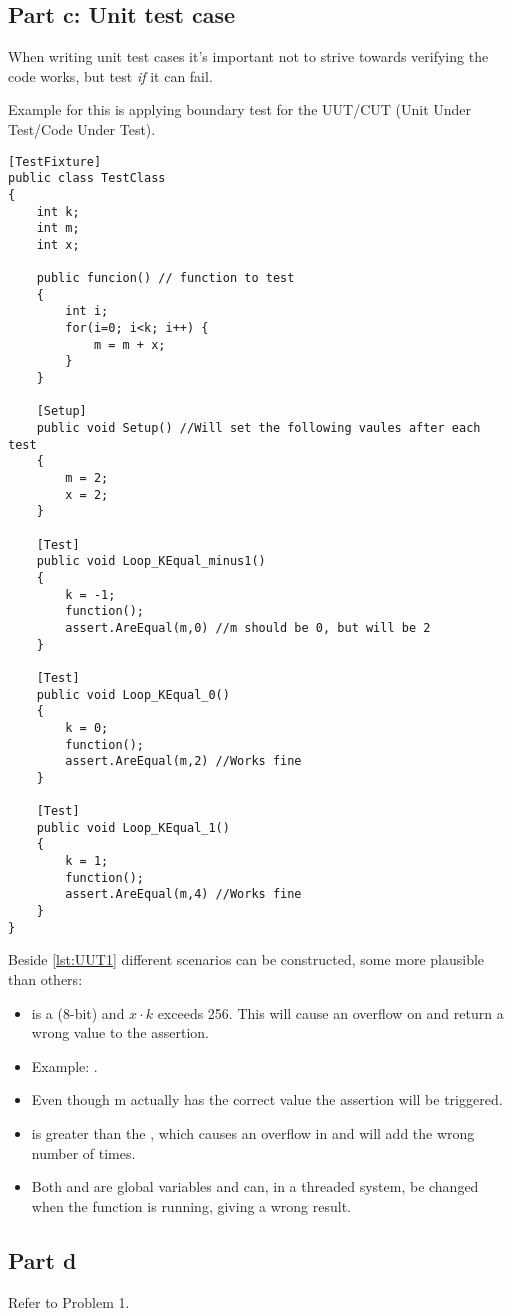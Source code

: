\documentclass[Main_Assignment4]{subfiles}
\begin{document}
\subsection{Part c: Unit test case}
When writing unit test cases it's important not to strive towards verifying the code works, but test \emph{if} it can fail.

Example for this is applying boundary test for the UUT/CUT (Unit Under Test/Code Under Test). 

\begin{lstlisting}[caption=Unit tests -- different k-values, style=Code-C++, label=lst:UUT1]
[TestFixture]
public class TestClass
{
	int k;
	int m;
	int x;

	public funcion() // function to test
	{
		int i;
		for(i=0; i<k; i++) {
			m = m + x;
		}
	}

	[Setup]
	public void Setup() //Will set the following vaules after each test
	{
		m = 2;
		x = 2;
	}

	[Test]
	public void Loop_KEqual_minus1()
	{
		k = -1;
		function();
		assert.AreEqual(m,0) //m should be 0, but will be 2
	}

	[Test]
	public void Loop_KEqual_0()
	{
		k = 0;
		function();
		assert.AreEqual(m,2) //Works fine
	}

	[Test]
	public void Loop_KEqual_1()
	{
		k = 1;
		function();
		assert.AreEqual(m,4) //Works fine
	}
}
\end{lstlisting}

Beside \codeTitle \ref{lst:UUT1} different scenarios can be constructed, some more plausible than others:
\begin{itemize}
	\item {}  is a  (8-bit) and $x \cdot k$ exceeds 256. This will cause an overflow on  and return a wrong value to the assertion.
	\item[] Example: .
	\item[] Even though m actually has the correct value the assertion will be triggered.

	\item {} is greater than the , which causes an overflow in  and will add  the wrong number of times.

	\item Both  and  are global variables and can, in a threaded system, be changed when the function is running, giving a wrong result.
\end{itemize}

\subsection{Part d}
Refer to Problem 1.
\end{document}
